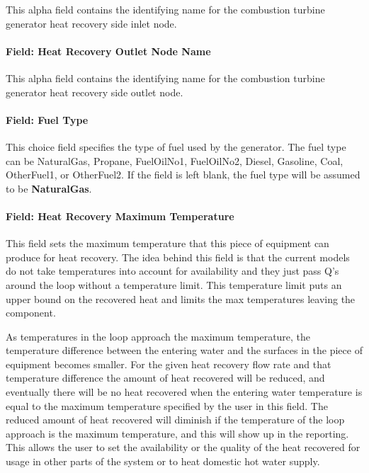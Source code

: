 This alpha field contains the identifying name for the combustion turbine generator heat recovery side inlet node.

\paragraph{Field: Heat Recovery Outlet Node Name}\label{field-heat-recovery-outlet-node-name-1}

This alpha field contains the identifying name for the combustion turbine generator heat recovery side outlet node.

\paragraph{Field: Fuel Type}\label{field-fuel-type-1}

This choice field specifies the type of fuel used by the generator. The fuel type can be NaturalGas, Propane, FuelOilNo1, FuelOilNo2, Diesel, Gasoline, Coal, OtherFuel1, or OtherFuel2. If the field is left blank, the fuel type will be assumed to be \textbf{NaturalGas}.

\paragraph{Field: Heat Recovery Maximum Temperature}\label{field-heat-recovery-maximum-temperature-1}

This field sets the maximum temperature that this piece of equipment can produce for heat recovery. The idea behind this field is that the current models do not take temperatures into account for availability and they just pass Q's around the loop without a temperature limit. This temperature limit puts an upper bound on the recovered heat and limits the max temperatures leaving the component.

As temperatures in the loop approach the maximum temperature, the temperature difference between the entering water and the surfaces in the piece of equipment becomes smaller. For the given heat recovery flow rate and that temperature difference the amount of heat recovered will be reduced, and eventually there will be no heat recovered when the entering water temperature is equal to the maximum temperature specified by the user in this field. The reduced amount of heat recovered will diminish if the temperature of the loop approach is the maximum temperature, and this will show up in the reporting. This allows the user to set the availability or the quality of the heat recovered for usage in other parts of the system or to heat domestic hot water supply.

